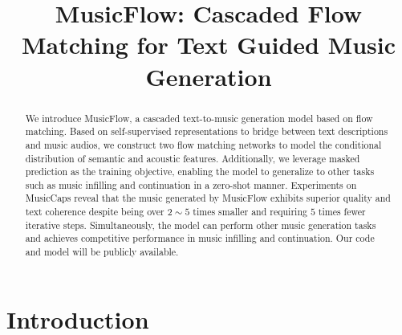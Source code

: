 \title{MusicFlow: Cascaded Flow Matching for Text Guided Music Generation}




\printAffiliationsAndNotice{\icmlEqualContribution} %

\begin{abstract}

We introduce MusicFlow, a cascaded text-to-music generation model based on flow matching. Based on self-supervised representations to bridge between text descriptions and music audios, we construct two flow matching networks to model the conditional distribution of semantic and acoustic features. Additionally, we leverage masked prediction as the training objective, enabling the model to generalize to other tasks such as music infilling and continuation in a zero-shot manner. Experiments on MusicCaps reveal that the music generated by MusicFlow exhibits superior quality and text coherence despite being over $2\sim5$ times smaller and requiring $5$ times fewer iterative steps. Simultaneously, the model can perform other music generation tasks and achieves competitive performance in music infilling and continuation. 
Our code and model will be publicly available. 
\end{abstract}

\section{Introduction}
\label{sec:intro}

